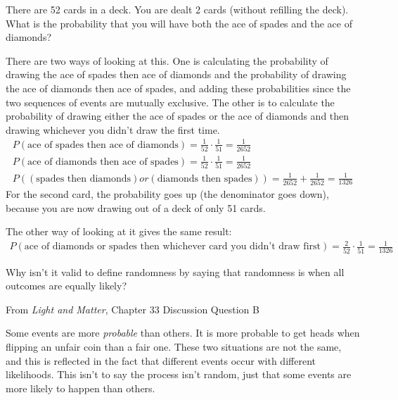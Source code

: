 \documentclass[12pt]{exam}
\begin{document}
\begin{questions}
	\question There are 52 cards in a deck. You are dealt 2 cards (without refilling the deck). What is the probability that you will have both the ace of spades and the ace of diamonds?
		\begin{TheSolution}
There are two ways of looking at this. One is calculating the probability of drawing the ace of spades then ace of diamonds and the probability of drawing the ace of diamonds then ace of spades, and adding these probabilities since the two sequences of events are mutually exclusive. The other is to calculate the probability of drawing either the ace of spades or the ace of diamonds and then drawing whichever you didn't draw the first time.
\begin{eqnarray}
P(\text{ace of spades then ace of diamonds}) = \frac{1}{52}\cdot \frac{1}{51} = \frac{1}{2652} \nonumber \\
P(\text{ace of diamonds then ace of spades}) = \frac{1}{52}\cdot \frac{1}{51} = \frac{1}{2652} \nonumber \\
P((\text{spades then diamonds}) or (\text{diamonds then spades})) = \frac{1}{2652} + \frac{1}{2652} = \frac{1}{1326} \nonumber
\end{eqnarray}
For the second card, the probability goes up (the denominator goes down), because you are now drawing out of a deck of only 51 cards.

The other way of looking at it gives the same result:
\begin{eqnarray}
P(\text{ace of diamonds or spades then whichever card you didn't draw first}) = \frac{2}{52}\cdot\frac{1}{51} = \frac{1}{1326}\nonumber 
\end{eqnarray}

\end{TheSolution}
	
	\question Why isn't it valid to define randomness by saying that randomness is when all outcomes are equally likely?
		
	
	From \textit{Light and Matter}, Chapter 33 Discussion Question B
	\begin{TheSolution}
	Some events are more \textit{probable} than others. It is more probable to get heads when flipping an unfair coin than a fair one. These two situations are not the same, and this is reflected in the fact that different events occur with different likelihoods. This isn't to say the process isn't random, just that some events are more likely to happen than others.
	\end{TheSolution}
	

\end{questions}
\end{document}
